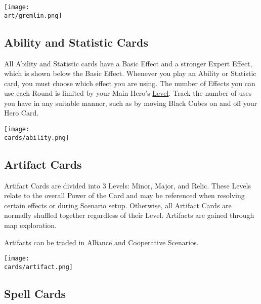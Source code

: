 \begin{multicols*}{2}
\vspace*{\fill}
\begin{center}
  \hspace{3em}
  \texttt{[image: \\art/gremlin.png]}
\end{center}

\clearpage

\subsection*{\hypertarget{Ability}{Ability and Statistic Cards}}

All Ability and Statistic cards have a Basic Effect and a stronger Expert  Effect, which is shown below the Basic Effect.
Whenever you play an Ability or Statistic card, you must choose which effect you are using.
The number of  Effects you can use each Round is limited by your Main Hero's \hyperlink{Level}{Level}.
Track the number of uses you have in any suitable manner, such as by moving Black Cubes on and off your Hero Card.\par
\bigskip

\texttt{[image: \\cards/ability.png]}


\subsection*{Artifact Cards}
Artifact Cards are divided into 3 Levels: Minor, Major, and Relic.
These Levels relate to the overall Power of the Card and may be referenced when resolving certain effects or during Scenario setup.
Otherwise, all Artifact Cards are normally shuffled together regardless of their Level.
Artifacts are gained through map exploration.\par
Artifacts can be \hyperlink{Trading}{traded} in Alliance and Cooperative Scenarios.\par
\texttt{[image: \\cards/artifact.png]}

\subsection*{\hypertarget{spells}{Spell Cards}}



\end{multicols*}

